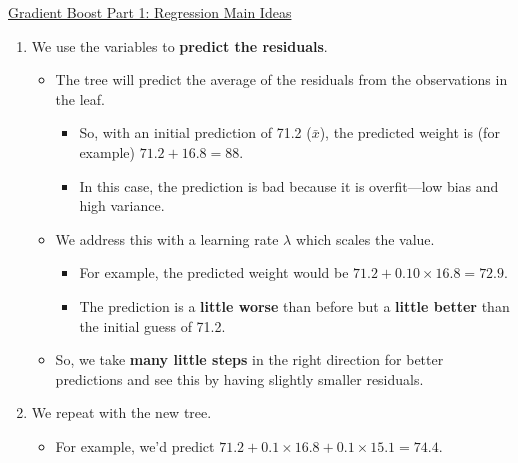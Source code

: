 \documentclass[12pt, titlepage, french]{report}
\begin{document}
\begin{YTB_SUMM_AUTO_NUMB}[label = {SQ-Boo-Reg-Idea}]{\href{https://www.youtube.com/watch?v=3CC4N4z3GJc&feature=youtu.be}{Gradient Boost Part 1: Regression Main Ideas}}
\begin{enumerate}[leftmargin = *]
	\item	We use the variables to \textbf{predict the residuals}.
	\begin{itemize}[leftmargin = *]
	\item	The tree will predict the average of the residuals from the observations in the leaf.
	\begin{itemize}[leftmargin = *]
	\item	So, with an initial prediction of 71.2 ($\bar{x}$), the predicted weight is (for example) $71.2 + 16.8 = 88$.
	\item	In this case, the prediction is bad because it is overfit---low bias and high variance.
	\end{itemize}
	\item	We address this with a learning rate $\lambda$ which scales the value.
	\begin{itemize}[leftmargin = *]
	\item	For example, the predicted weight would be $71.2 + 0.10 \times  16.8 = 72.9$.
	\item	The prediction is a \textbf{little worse} than before but a \textbf{little better} than the initial guess of 71.2.
	\end{itemize}
	\item	So, we take \textbf{many little steps} in the right direction for better predictions and see this by having slightly smaller residuals.
	\end{itemize}

	\item	We repeat with the new tree.
	\begin{itemize}[leftmargin = *]
	\item	For example, we'd predict $71.2 + 0.1 \times 16.8 + 0.1 \times 15.1 = 74.4$.
	\end{itemize}
\end{enumerate}
\end{YTB_SUMM_AUTO_NUMB}
\end{document}
